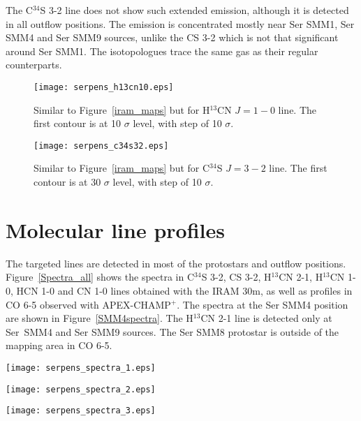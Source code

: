 \documentclass{aa}
\begin{document}
\begin{appendix}
The C$^{34}$S 3-2 line does not show such extended emission, although it is detected in all outflow positions. The emission is concentrated mostly near Ser SMM1, Ser SMM4 and Ser SMM9 sources, unlike the CS 3-2 which is not that significant around Ser SMM1. The isotopologues trace the same gas as their regular counterparts.

\begin{figure} \texttt{[image: serpens\_h13cn10.eps]} \caption{Similar to Figure~\ref{iram_maps}
but for H$^{13}$CN $J=1-0$ line. The first contour is at 10 $\sigma$ level, with step
of 10 $\sigma$.} \label{h13cn10} \end{figure}


\begin{figure} \texttt{[image: serpens\_c34s32.eps]} \caption{Similar to Figure~\ref{iram_maps}
but for C$^{34}$S $J=3-2$ line. The first contour is at 30 $\sigma$ level, with step of
10 $\sigma$.} \label{c34s32} \end{figure}

\section{Molecular line profiles}
\label{app:lines}

The targeted lines are detected in most of the protostars and outflow positions. Figure~\ref{Spectra_all} shows the spectra in C$^{34}$S 3-2, CS 3-2, H$^{13}$CN 2-1, H$^{13}$CN 1-0, HCN 1-0 and CN 1-0 lines obtained with the IRAM 30m, as well as profiles in CO 6-5 observed with APEX-CHAMP$^+$. The spectra at the Ser SMM4 position are shown in Figure~\ref{SMM4spectra}. The H$^{13}$CN 2-1 line is detected only at Ser~SMM4 and Ser SMM9 sources. The Ser SMM8 protostar is outside of the mapping area in CO 6-5.



\begin{figure*} 
\centering 
\texttt{[image: serpens\_spectra\_1.eps]}
\label{Spectra1} 
\end{figure*} 

\begin{figure*} 
\centering
\texttt{[image: serpens\_spectra\_2.eps]} 
\label{Spectra2} 
\end{figure*}

\begin{figure*}
\centering 
\texttt{[image: serpens\_spectra\_3.eps]}
\label{Spectra3} 
\end{figure*} 


\end{appendix}
\end{document}
